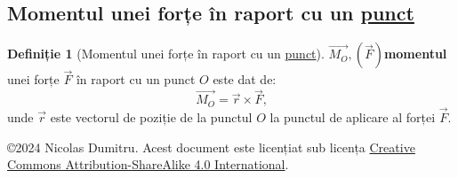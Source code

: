 \documentclass[a4paper]{article}
\theoremstyle{definition}
\newtheorem{definition}{Definiție}[section]
\theoremstyle{plain}%
\theoremstyle{remark}
\begin{document}
\subsection{Momentul unei forțe în raport cu un \underline{punct}}

\begin{definition}[Momentul unei forțe în raport cu un \underline{punct}]
	\(\overrightarrow{M_O}, (\vec F)\)\textbf{momentul} unei forțe \(\vec F\) în raport cu un punct \(O\) este dat de:
	\begin{equation*}
		\overrightarrow{M_O} = \vec r \times \vec F \text{,}
	\end{equation*}
	unde \(\vec r\) este vectorul de poziție de la punctul \(O\) la punctul de aplicare al forței \(\vec F\).
\end{definition}

\begin{flushright}
	\copyright 2024 Nicolas Dumitru.
	Acest document este licențiat sub licența \href{https://creativecommons.org/licenses/by-sa/4.0/}{Creative Commons Attribution-ShareAlike 4.0 International}.

\end{flushright}
\end{document}
